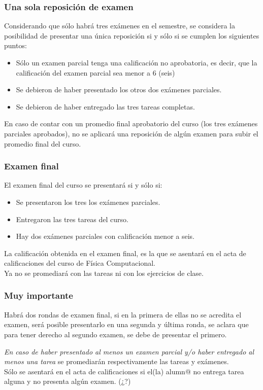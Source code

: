 \begin{frame}
\frametitle{Una sola reposición de examen}
Considerando que sólo habrá tres exámenes en el semestre, se considera la posibilidad de presentar una única reposición si y sólo si se cumplen los siguientes puntos:
\begin{itemize}[<+->]
	\item Sólo un examen parcial tenga una calificación no aprobatoria, es decir, que la calificación del examen parcial sea menor a 6 (seis)
	\item Se debieron de haber presentado los otros dos exámenes parciales.
	\item Se debieron de haber entregado las tres tareas completas.
\end{itemize}
\end{frame}
\begin{frame}
En caso de contar con un promedio final aprobatorio del curso (los tres exámenes parciales aprobados), no se aplicará una reposición de algún examen para subir el promedio final del curso.
\end{frame}
\begin{frame}
\frametitle{Examen final}
El examen final del curso se presentará si y sólo si:
\begin{itemize}[<+->]
\item Se presentaron los tres los exámenes parciales.
\item Entregaron las tres tareas del curso.
\item Hay dos exámenes parciales con calificación menor a seis.
\end{itemize}
\end{frame}
\begin{frame}
La calificación obtenida en el examen final, es la que se asentará en el acta de calificaciones del curso de Física Computacional.
\\
\bigskip
Ya no se promediará con las tareas ni con los ejercicios de clase.
\end{frame}
\begin{frame}
\frametitle{Muy importante}
Habrá dos rondas de examen final, si en la primera de ellas no se acredita el examen, será posible presentarlo en una segunda y última ronda, se aclara que para tener derecho al segundo examen, se debe de presentar el primero.
\end{frame}
\begin{frame}
\emph{En caso de haber presentado al menos un examen parcial y/o haber entregado al menos una tarea} se promediarán respectivamente las tareas y exámenes.
\\
\bigskip
Sólo se asentará en el acta de calificaciones  si el(la) alumn{@} no entrega tarea alguna y no presenta algún examen. (¿?)
\end{frame}
